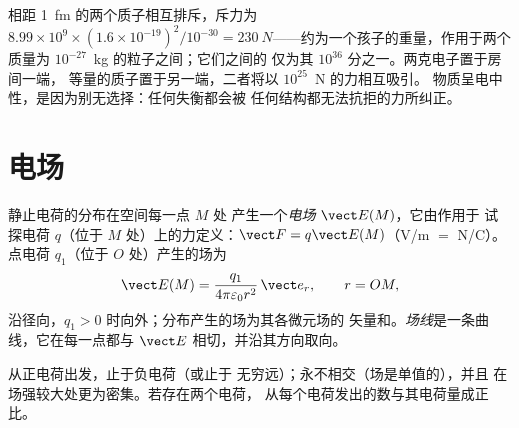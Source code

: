 \begin{example}[有多强]\label{ex:b1:electrostatics-gauss:strong}
相距 \qty{1}{fm} 的两个质子相互排斥，斥力为 $8.99 \times 10^9 \times (1.6 \times
10^{-19})^2/10^{-30} = \qty{230}{N}$——约为一个孩子的重量，作用于两个
质量为 $10^{-27}$~kg 的粒子之间；它们之间的
仅为其 $10^{36}$ 分之一。两克电子置于房间一端，
等量的质子置于另一端，二者将以 $10^{25}$~N 的力相互吸引。
物质呈电中性，是因为别无选择：任何失衡都会被
任何结构都无法抗拒的力所纠正。
\end{example}

\section{电场}

\begin{definition}[静电场]\label{def:b1:electrostatics-gauss:field}
静止电荷的分布在空间每一点 $M$ 处
产生一个\emph{电场} $\vect E(M)$，它由作用于
试探电荷 $q$（位于 $M$ 处）上的力定义：$\vect F = q\vect E(M)$（\unit{V/m} $=$
\unit{N/C}）。点电荷 $q_1$（位于 $O$ 处）产生的场为
\[
\vect E(M) = \frac{q_1}{4\pi\varepsilon_0 r^2}\,\vect e_r , \qquad r = OM ,
\]
沿径向，$q_1 > 0$ 时向外；分布产生的场为其各微元场的
矢量和。\emph{场线}是一条曲线，它在每一点都与
$\vect E$ 相切，并沿其方向取向。
\end{definition}

\begin{proposition}[读懂场线图]\label{prop:b1:electrostatics-gauss:lines}
从正电荷出发，止于负电荷（或止于
无穷远）；永不相交（场是单值的），并且
在场强较大处更为密集。若存在两个电荷，
从每个电荷发出的数与其电荷量成正比。
\end{proposition}

